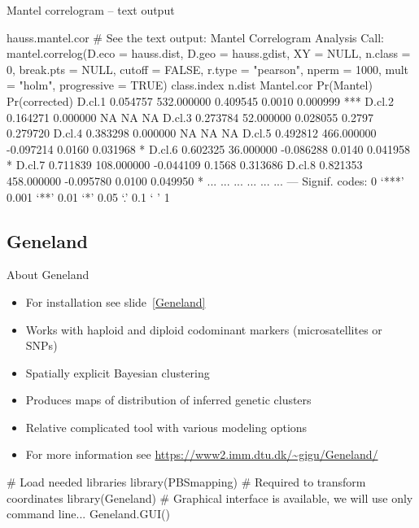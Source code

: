 \documentclass[compress, ucs, xelatex, 11pt, xcolor=svgnames,
  hyperref={
    bookmarks=true,
    unicode=true,
    colorlinks=true,
    pdftitle={Molecular data in R},
    plainpages=false,
    pdfauthor={Vojtech Zeisek},
    pdfsubject={Course about phylogeny and evolution in R},
    pdfcreator={XeLaTeX},
    pdfkeywords={R, evolution, phylogeny, molecular data},
    linkcolor=Tomato,
    anchorcolor=SaddleBrown,
    citecolor=Goldenrod,
    filecolor=DarkMagenta,
    menucolor=Sienna,
    urlcolor=DarkTurquoise,
    pdftex},
  url={hyphens, lowtilde} %
  ]{beamer}
\begin{document}
\begin{frame}[fragile]{Mantel correlogram -- text output}
  \begin{spluscode}
    hauss.mantel.cor # See the text output:
    Mantel Correlogram Analysis
    Call:
    mantel.correlog(D.eco = hauss.dist, D.geo = hauss.gdist, XY = NULL,
     n.class = 0, break.pts = NULL, cutoff = FALSE, r.type = "pearson",
     nperm = 1000, mult = "holm", progressive = TRUE) 
            class.index     n.dist Mantel.cor Pr(Mantel) Pr(corrected)
    D.cl.1     0.054757 532.000000   0.409545     0.0010      0.000999 ***
    D.cl.2     0.164271   0.000000         NA         NA            NA
    D.cl.3     0.273784  52.000000   0.028055     0.2797      0.279720
    D.cl.4     0.383298   0.000000         NA         NA            NA
    D.cl.5     0.492812 466.000000  -0.097214     0.0160      0.031968 *
    D.cl.6     0.602325  36.000000  -0.086288     0.0140      0.041958 *
    D.cl.7     0.711839 108.000000  -0.044109     0.1568      0.313686
    D.cl.8     0.821353 458.000000  -0.095780     0.0100      0.049950 *
       ...          ...        ...        ...        ...           ...
    ---
    Signif. codes:  0 ‘***’ 0.001 ‘**’ 0.01 ‘*’ 0.05 ‘.’ 0.1 ‘ ’ 1
  \end{spluscode}
\end{frame}

\subsection{Geneland}

\begin{frame}[fragile]{About Geneland}
  \label{GenelandUse}
  \begin{itemize}
    \item For installation see slide~\ref{Geneland}
    \item Works with haploid and diploid codominant markers (microsatellites or SNPs)
    \item Spatially explicit Bayesian clustering
    \item Produces maps of distribution of inferred genetic clusters
    \item Relative complicated tool with various modeling options
    \item For more information see \url{https://www2.imm.dtu.dk/~gigu/Geneland/}
  \end{itemize}
  \vfill
  \begin{spluscode}
    # Load needed libraries
    library(PBSmapping) # Required to transform coordinates
    library(Geneland)
    # Graphical interface is available, we will use only command line...
    Geneland.GUI()
  \end{spluscode}
\end{frame}
\end{document}

